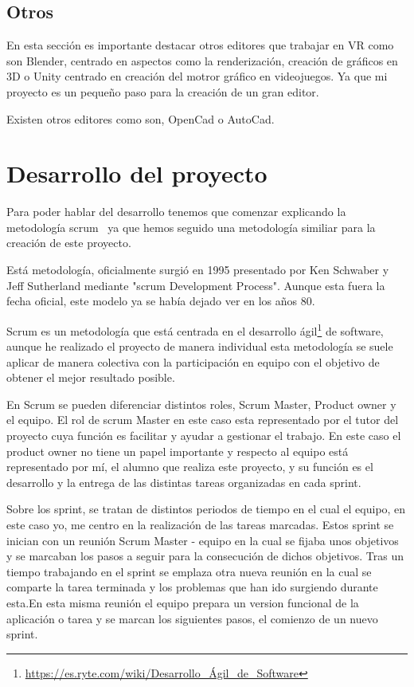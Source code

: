 \documentclass[a4paper, 12pt]{book}
\begin{document}
\section{Otros} %
\label{sec:Otros}
En esta sección es importante destacar otros editores que trabajar en VR como son Blender, centrado en aspectos como la renderización, creación de gráficos en 3D o Unity centrado en creación del motror gráfico en videojuegos. Ya que mi proyecto es un pequeño paso para la creación de un gran editor.

Existen otros editores como son, OpenCad o AutoCad.


\cleardoublepage
\chapter{Desarrollo del proyecto}
\label{chap:Desarrollo del proyecto}
Para poder hablar del desarrollo tenemos que comenzar explicando la metodología scrum~\cite{proyectos} ya que hemos seguido una metodología similiar para la creación de este proyecto.

Está metodología, oficialmente surgió en 1995 presentado por Ken Schwaber y Jeff Sutherland mediante "scrum Development Process". Aunque esta fuera la fecha oficial, este modelo ya se había dejado ver en los años 80.

Scrum es un metodología que está centrada en el desarrollo ágil\footnote{\url{https://es.ryte.com/wiki/Desarrollo_Ágil_de_Software}}  de software, aunque he realizado el proyecto de manera individual esta metodología se suele aplicar de manera colectiva con la participación en equipo con el objetivo de obtener el mejor resultado posible.

En Scrum se pueden diferenciar distintos roles, Scrum Master, Product owner y el equipo. El rol de scrum Master en este caso esta representado por el tutor del proyecto cuya función es facilitar y ayudar a gestionar el trabajo. En este caso el product owner no tiene un papel importante y respecto al equipo está representado por mí, el alumno que realiza este proyecto, y su función es el desarrollo y la entrega de las distintas tareas organizadas en cada sprint.

Sobre los sprint, se tratan de distintos periodos de tiempo en el cual el equipo, en este caso yo, me centro en la realización de las tareas marcadas. Estos sprint se inician con un reunión Scrum Master - equipo en la cual se fijaba unos objetivos y se marcaban los pasos a seguir para la consecución de dichos objetivos. Tras un tiempo trabajando en el sprint se emplaza otra nueva reunión en la cual se comparte la tarea terminada y los problemas que han ido surgiendo durante esta.En esta misma reunión el equipo prepara un version funcional de la aplicación o tarea y se marcan los siguientes pasos, el comienzo de un nuevo sprint. 
\end{document}
